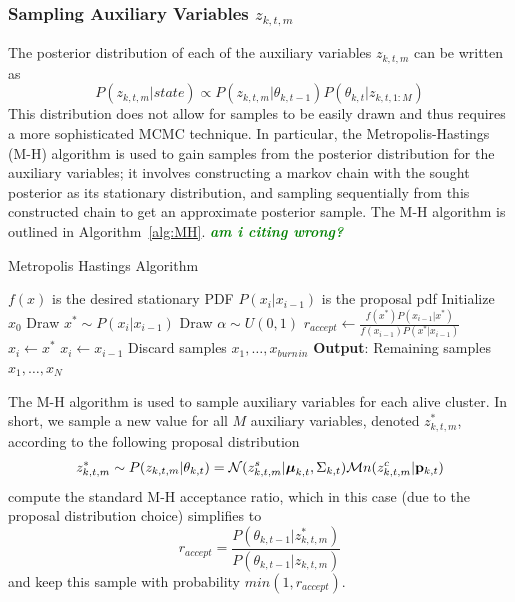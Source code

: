 \documentclass[smallcondensed, final]{svjour3}
\newcommand{\willie}[1]{\textcolor{green}{\textsf{\emph{\textbf{\textcolor{green}{#1}}}}}}
\begin{document}

\subsubsection{Sampling Auxiliary Variables $z_{k,t,m}$}
The posterior distribution of each of the auxiliary variables $z_{k,t,m}$ can be written as
\begin{equation}
P(z_{k,t,m} | state) \propto  P(z_{k,t,m} | \theta_{k,t-1}) P(\theta_{k,t} | z_{k,t,1:M})
\end{equation}
This distribution does not allow for samples to be easily drawn and thus requires a more sophisticated MCMC technique. In particular, the Metropolis-Hastings (M-H) algorithm is used to gain samples from the posterior distribution for the auxiliary variables; it involves constructing a markov chain with the sought posterior as its stationary distribution, and sampling sequentially from this constructed chain to get an approximate posterior sample. The M-H algorithm is outlined in Algorithm~\ref{alg:MH}. \willie{am i citing wrong?}

\begin{algorithm}[h]
\label{alg:MH}
\caption{Metropolis Hastings Algorithm}
\begin{algorithmic}[1]
\STATE $f(x)$ is the desired stationary PDF
\STATE $P(x_{i} | x_{i-1})$ is the proposal pdf
\STATE Initialize $x_{0}$
\STATE Draw $x^{*} \sim P(x_{i} | x_{i-1})$
\STATE Draw $\alpha \sim U(0,1)$
\STATE $r_{accept} \leftarrow \frac{f(x^{*})P(x_{i-1} | x^{*})} {f(x_{i-1})P(x^{*} | x_{i-1})} $
\STATE $x_{i} \leftarrow x^{*}$
\ELSE
\STATE $x_{i} \leftarrow x_{i-1}$
\ENDIF
\ENDFOR
\STATE Discard samples $x_{1}, \ldots, x_{burn\hspace{1pt}in}$
\STATE \textbf{Output}: Remaining samples $x_{1}, \ldots, x_{N}$
\end{algorithmic}
\end{algorithm}


The M-H algorithm is used to sample auxiliary variables for each alive cluster. In short, we sample a new value for all $M$ auxiliary variables, denoted $z_{k,t,m}^{*}$, according to the following proposal distribution
\begin{equation}
z_{k,t,m}^{*}  \sim  P(z_{k,t,m} | \theta_{k,t}) = \mathcal{N}(z_{k,t,m}^{s} | \boldsymbol{\mu}_{k,t}, \Sigma_{k,t}) \mathcal{M}n(z_{k,t,m}^{c} | \bold{p}_{k,t})
\end{equation}
compute the standard M-H acceptance ratio, which in this case (due to the proposal distribution choice) simplifies to 
\begin{equation}
r_{accept} = \frac{P(\theta_{k,t-1} | z_{k,t,m}^{*})}{P(\theta_{k,t-1} | z_{k,t,m})}
\end{equation}
and keep this sample with probability $min(1, r_{accept})$.
\end{document}
